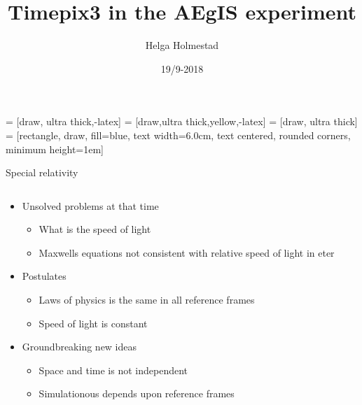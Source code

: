 \documentclass{beamer}
\title[]{Timepix3 in the AEgIS experiment}
\author{Helga Holmestad}
\institute{University of Oslo}
\date{19/9-2018}
\begin{document}
\begin{frame}
  \titlepage
\end{frame}


   = [draw, ultra thick,-latex]
       = [draw,ultra thick,yellow,-latex]
       = [draw, ultra thick]
       = [rectangle, draw, fill=blue, 
        text width=6.0cm, text centered, rounded corners, minimum height=1em]
      
\begin{frame}{\centering Special relativity}
  \begin{columns}
    \begin{column}{0.5\textwidth}
      \begin{itemize}
      \item{Unsolved problems at that time}
        \begin{itemize}
        \item{What is the speed of light}
        \item{Maxwells equations not consistent with relative speed of light in eter}
        \end{itemize}
      \item{Postulates}
        \begin{itemize}
        \item{Laws of physics is the same in all reference frames}
        \item{Speed of light is constant}
        \end{itemize}
      \item{Groundbreaking new ideas}
        \begin{itemize}
        \item{Space and time is not independent}
        \item{Simulationous depends upon reference frames}
        \end{itemize}
      \end{itemize}
    \end{column}
    \begin{column}{0.5\textwidth}
      \begin{center}
\end{center}
\end{column}
\end{columns}
\end{frame}
\end{document}
